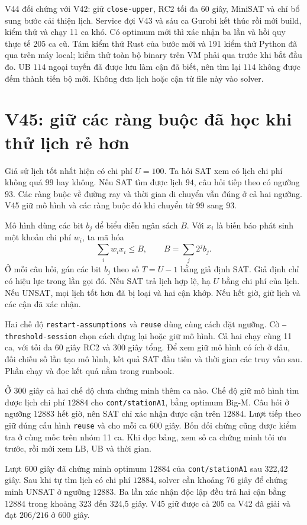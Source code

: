 \documentclass[11pt,a4paper]{article}
\newcommand{\code}[1]{\texttt{#1}}
\begin{document}
V44 đối chứng với V42: giữ \code{close-upper}, RC2 tối đa 60 giây,
MiniSAT và chỉ bổ sung bước cải thiện lịch. Service đợi V43 và sáu ca
Gurobi kết thúc rồi mới build, kiểm thử và chạy 11 ca khó. Có optimum
mới thì xác nhận ba lần và hồi quy thực tế 205 ca cũ. Tám kiểm thử Rust
của bước mới và 191 kiểm thử Python đã qua trên máy local; kiểm thử
toàn bộ binary trên VM phải qua trước khi bắt đầu đo. UB $114$ ngoại
tuyến đã được lưu làm cận đã biết, nên tìm lại $114$ không được đếm
thành tiến bộ mới. Không đưa lịch hoặc cận từ file này vào solver.

\section{V45: giữ các ràng buộc đã học khi thử lịch rẻ hơn}

Giả sử lịch tốt nhất hiện có chi phí $U=100$. Ta hỏi SAT xem có lịch
chi phí không quá $99$ hay không. Nếu SAT tìm được lịch $94$, câu
hỏi tiếp theo có ngưỡng $93$. Các ràng buộc về đường ray và thời gian
di chuyển vẫn đúng ở cả hai ngưỡng. V45 giữ mô hình và các ràng buộc
đó khi chuyển từ $99$ sang $93$.

Mô hình dùng các bit $b_j$ để biểu diễn ngân sách $B$. Với
$x_i$ là biến báo phát sinh một khoản chi phí $w_i$, ta mã hóa
\[
  \sum_i w_i x_i\le B,\qquad B=\sum_j 2^j b_j.
\]
Ở mỗi câu hỏi, gán các bit $b_j$ theo số $T=U-1$ bằng giả định
SAT. Giả định chỉ có hiệu lực trong lần gọi đó. Nếu SAT trả lịch hợp
lệ, hạ $U$ bằng chi phí của lịch. Nếu UNSAT, mọi lịch tốt hơn đã bị
loại và hai cận khớp. Nếu hết giờ, giữ lịch và các cận đã xác nhận.

Hai chế độ \code{restart-assumptions} và \code{reuse} dùng cùng
cách đặt ngưỡng. Cờ \code{--threshold-session} chọn cách dựng lại
hoặc giữ mô hình. Cả hai chạy cùng 11 ca, với tối đa 60 giây RC2
và 300 giây tổng. Để xem giữ mô hình có ích ở đâu, đối chiếu số lần
tạo mô hình, kết quả SAT đầu tiên và thời gian các truy vấn sau.
Phần chạy và đọc kết quả nằm trong runbook.

Ở 300 giây cả hai chế độ chưa chứng minh thêm ca nào. Chế độ giữ
mô hình tìm được lịch chi phí $12884$ cho \code{cont/stationA1},
bằng optimum Big-M. Câu hỏi ở ngưỡng $12883$ hết giờ, nên SAT chỉ
xác nhận được cận trên $12884$. Lượt tiếp theo giữ đúng cấu hình
\code{reuse} và cho mỗi ca 600 giây. Bốn đối chứng cũng được kiểm
tra ở cùng mốc trên nhóm 11 ca. Khi đọc bảng, xem số ca chứng minh
tối ưu trước, rồi mới xem LB, UB và thời gian.

Lượt 600 giây đã chứng minh optimum $12884$ của
\code{cont/stationA1} sau 322,42 giây. Sau khi tự tìm lịch có chi
phí $12884$, solver cần khoảng 76 giây để chứng minh UNSAT ở
ngưỡng $12883$. Ba lần xác nhận độc lập đều trả hai cận bằng
$12884$ trong khoảng 323 đến 324,5 giây. V45 giữ được cả 205 ca
V42 đã giải và đạt $206/216$ ở 600 giây.
\end{document}
